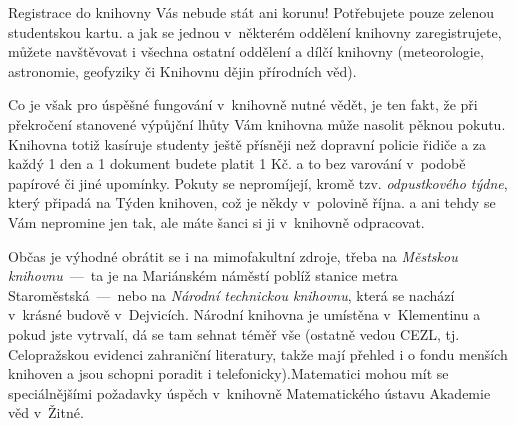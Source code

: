 Registrace do knihovny Vás nebude stát ani korunu! Potřebujete
pouze zelenou studentskou kartu. a jak se jednou v~některém
oddělení knihovny zaregistrujete, můžete navštěvovat i všechna
ostatní oddělení a dílčí knihovny (meteorologie, astronomie,
geofyziky či Knihovnu dějin přírodních věd).

Co je však pro úspěšné fungování v~knihovně nutné vědět, je ten
fakt, že při překročení stanovené výpůjční lhůty Vám knihovna může
nasolit pěknou pokutu. Knihovna totiž kasíruje studenty ještě
přísněji než dopravní policie řidiče a za každý 1 den a 1 dokument
budete platit 1 Kč. a to bez varování v~podobě papírové či jiné
upomínky. Pokuty se nepromíjejí, kromě tzv. {\it odpustkového
týdne}, který připadá na Týden knihoven, což je někdy v~polovině
října. a ani tehdy se Vám nepromine jen tak, ale máte šanci si ji
v~knihovně odpracovat.

Občas je výhodné obrátit se i na mimofakultní zdroje, třeba na
{\it Městskou knihovnu}~---~ta je na Mariánském náměstí poblíž
stanice metra Staroměstská~---~nebo na {\it Národní technickou
knihovnu}, která se nachází v~krásné budově v~Dejvicích. {Národní
knihovna} je umístěna v~Klementinu a pokud jste vytrvalí, dá se
tam sehnat téměř vše (ostatně vedou CEZL, tj. Celopražskou
evidenci zahraniční literatury, takže mají přehled i o fondu
menších knihoven a jsou schopni poradit i telefonicky).Matematici
mohou mít se speciálnějšími požadavky úspěch v~knihovně
Matematického ústavu Akademie věd v~Žitné.